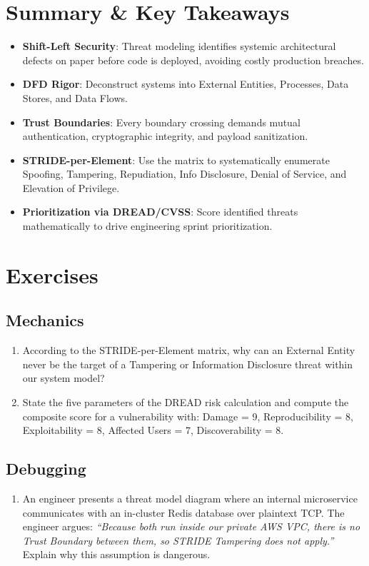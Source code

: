 \section{Summary \protect\& Key Takeaways}

\begin{itemize}[leftmargin=18pt]
  \item \textbf{Shift-Left Security}: Threat modeling identifies systemic architectural defects on paper before code is deployed, avoiding costly production breaches.
  \item \textbf{DFD Rigor}: Deconstruct systems into External Entities, Processes, Data Stores, and Data Flows.
  \item \textbf{Trust Boundaries}: Every boundary crossing demands mutual authentication, cryptographic integrity, and payload sanitization.
  \item \textbf{STRIDE-per-Element}: Use the matrix to systematically enumerate Spoofing, Tampering, Repudiation, Info Disclosure, Denial of Service, and Elevation of Privilege.
  \item \textbf{Prioritization via DREAD/CVSS}: Score identified threats mathematically to drive engineering sprint prioritization.
\end{itemize}

\section{Exercises}

\subsection*{Mechanics}
\begin{enumerate}[leftmargin=18pt]
  \item According to the STRIDE-per-Element matrix, why can an External Entity never be the target of a Tampering or Information Disclosure threat within our system model?
  \item State the five parameters of the DREAD risk calculation and compute the composite score for a vulnerability with: Damage = 9, Reproducibility = 8, Exploitability = 8, Affected Users = 7, Discoverability = 8.
\end{enumerate}

\subsection*{Debugging}
\begin{enumerate}[leftmargin=18pt]
  \item An engineer presents a threat model diagram where an internal microservice communicates with an in-cluster Redis database over plaintext TCP. The engineer argues: \textit{``Because both run inside our private AWS VPC, there is no Trust Boundary between them, so STRIDE Tampering does not apply.''} Explain why this assumption is dangerous.
\end{enumerate}

